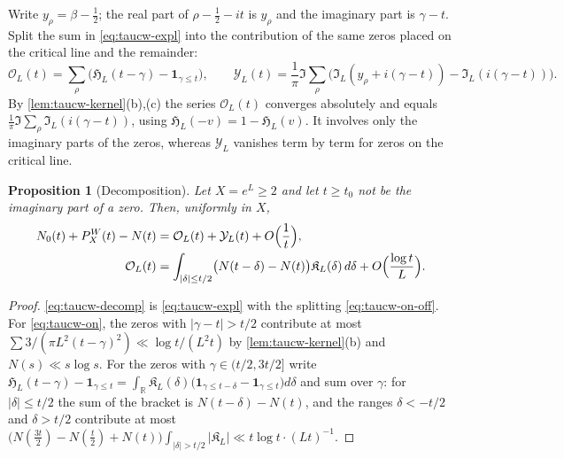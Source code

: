 \documentclass[11pt,a4paper]{article}
\numberwithin{equation}{section}
\newtheorem{proposition}[theorem]{Proposition}
\theoremstyle{definition}
\theoremstyle{remark}
\begin{document}
Write $y_\rho=\beta-\frac12$; the real part of $\rho-\frac12-it$ is $y_\rho$ and the imaginary part is $\gamma-t$. Split the sum in \eqref{eq:taucw-expl} into the contribution of the same zeros placed on the critical line and the remainder:
\begin{equation}\label{eq:taucw-on-off}
\mathcal O_L(t)=\sum_\rho\bigl(\mathfrak H_L(t-\gamma)-\mathbf 1_{\gamma\le t}\bigr),\qquad
\mathcal Y_L(t)=\frac1\pi\Im\sum_{\rho}\bigl(\mathfrak I_L(y_\rho+i(\gamma-t))-\mathfrak I_L(i(\gamma-t))\bigr).
\end{equation}
By \cref{lem:taucw-kernel}(b),(c) the series $\mathcal O_L(t)$ converges absolutely and equals $\frac1\pi\Im\sum_\rho\mathfrak I_L(i(\gamma-t))$, using $\mathfrak H_L(-v)=1-\mathfrak H_L(v)$. It involves only the imaginary parts of the zeros, whereas $\mathcal Y_L$ vanishes term by term for zeros on the critical line.

\begin{proposition}[Decomposition]\label{prop:taucw-decomp}
Let $X=e^L\ge2$ and let $t\ge t_0$ not be the imaginary part of a zero. Then, uniformly in $X$,
\begin{align}
N_0(t)+P_X^W(t)-N(t)&=\mathcal O_L(t)+\mathcal Y_L(t)+O\Bigl(\frac1t\Bigr),\label{eq:taucw-decomp}\\
\mathcal O_L(t)&=\int_{|\delta|\le t/2}\bigl(N(t-\delta)-N(t)\bigr)\mathfrak K_L(\delta)\,d\delta+O\Bigl(\frac{\log t}{L}\Bigr).\label{eq:taucw-on}
\end{align}
\end{proposition}
\begin{proof}
\eqref{eq:taucw-decomp} is \eqref{eq:taucw-expl} with the splitting \eqref{eq:taucw-on-off}. For \eqref{eq:taucw-on}, the zeros with $|\gamma-t|>t/2$ contribute at most $\sum3/(\pi L^2(t-\gamma)^2)\ll\log t/(L^2t)$ by \cref{lem:taucw-kernel}(b) and $N(s)\ll s\log s$. For the zeros with $\gamma\in(t/2,3t/2]$ write $\mathfrak H_L(t-\gamma)-\mathbf 1_{\gamma\le t}=\int_{\mathbb R}\mathfrak K_L(\delta)\bigl(\mathbf 1_{\gamma\le t-\delta}-\mathbf 1_{\gamma\le t}\bigr)d\delta$ and sum over $\gamma$: for $|\delta|\le t/2$ the sum of the bracket is $N(t-\delta)-N(t)$, and the ranges $\delta<-t/2$ and $\delta>t/2$ contribute at most $\bigl(N(\tfrac{3t}2)-N(\tfrac t2)+N(t)\bigr)\int_{|\delta|>t/2}|\mathfrak K_L|\ll t\log t\cdot(Lt)^{-1}$.
\end{proof}
\end{document}
